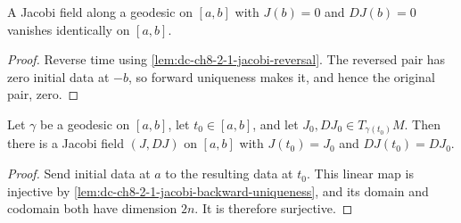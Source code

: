 \begin{lemma}
  \label{lem:dc-ch8-2-1-jacobi-backward-uniqueness}


  A Jacobi field along a geodesic on $[a,b]$ with $J(b)=0$ and $DJ(b)=0$ vanishes identically
  on $[a,b]$.
\end{lemma}
\begin{proof}

\sketch
  Reverse time using \cref{lem:dc-ch8-2-1-jacobi-reversal}. The reversed pair has zero
  initial data at $-b$, so forward uniqueness makes it, and hence the original pair, zero.
\end{proof}

\begin{lemma}
  \label{lem:dc-ch8-2-1-jacobi-interior-data}


  Let $\gamma$ be a geodesic on $[a,b]$, let $t_0\in[a,b]$, and let $J_0,DJ_0\in
  T_{\gamma(t_0)}M$. Then there is a Jacobi field $(J,DJ)$ on $[a,b]$ with
  $J(t_0)=J_0$ and $DJ(t_0)=DJ_0$.
\end{lemma}
\begin{proof}

\sketch
  Send initial data at $a$ to the resulting data at $t_0$. This linear map is injective by
  \cref{lem:dc-ch8-2-1-jacobi-backward-uniqueness}, and its domain and codomain both have
  dimension $2n$. It is therefore surjective.
\end{proof}

